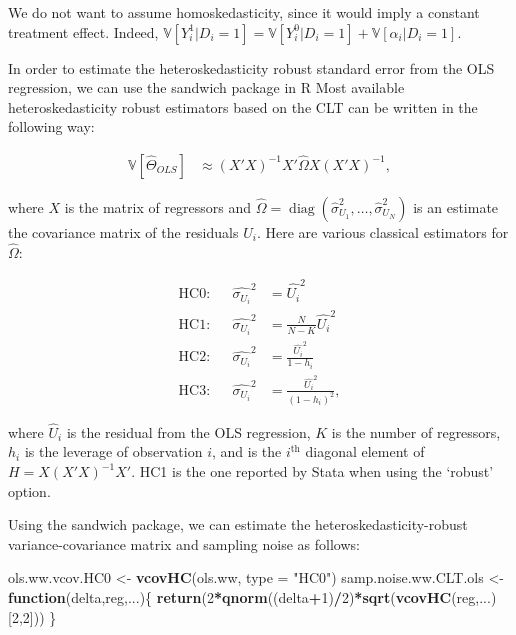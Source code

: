 \documentclass[]{book}
\newenvironment{Shaded}{\begin{snugshade}}{\end{snugshade}}
\newcommand{\KeywordTok}[1]{\textcolor[rgb]{0.13,0.29,0.53}{\textbf{#1}}}
\newcommand{\DataTypeTok}[1]{\textcolor[rgb]{0.13,0.29,0.53}{#1}}
\newcommand{\DecValTok}[1]{\textcolor[rgb]{0.00,0.00,0.81}{#1}}
\newcommand{\StringTok}[1]{\textcolor[rgb]{0.31,0.60,0.02}{#1}}
\newcommand{\ControlFlowTok}[1]{\textcolor[rgb]{0.13,0.29,0.53}{\textbf{#1}}}
\newcommand{\OperatorTok}[1]{\textcolor[rgb]{0.81,0.36,0.00}{\textbf{#1}}}
\newcommand{\NormalTok}[1]{#1}
\newcommand{\var}[1]{\mathbb{V}[ #1 ]}
\DeclareMathOperator{\diag}{diag}
\theoremstyle{definition}
\theoremstyle{definition}
\theoremstyle{definition}
\theoremstyle{remark}
\let\BeginKnitrBlock\begin \let\EndKnitrBlock\end
\begin{document}
We do not want to assume homoskedasticity, since it would imply a
constant treatment effect. Indeed,
\(\var{Y_i^1|D_i=1} = \var{Y_i^0|D_i=1}+\var{\alpha_i|D_i=1}\).

\BeginKnitrBlock{remark}
\iffalse{} {Remark. } \fi{}In order to estimate the heteroskedasticity
robust standard error from the OLS regression, we can use the sandwich
package in R Most available heteroskedasticity robust estimators based
on the CLT can be written in the following way:
\EndKnitrBlock{remark}

\begin{align*}
  \var{\hat{\Theta}_{OLS}} & \approx (X'X)^{-1}X'\hat{\Omega}X(X'X)^{-1},
\end{align*}

where \(X\) is the matrix of regressors and
\(\hat{\Omega}=\diag(\hat{\sigma}^2_{U_1},\dots,\hat{\sigma}^2_{U_N})\)
is an estimate the covariance matrix of the residuals \(U_i\). Here are
various classical estimators for \(\hat{\Omega}\):

\begin{align*}
  \text{HC0:} & & \hat{\sigma_{U_i}}^2 & = \hat{U_i}^2 \\
  \text{HC1:} & & \hat{\sigma_{U_i}}^2 & = \frac{N}{N-K}\hat{U_i}^2 \\
  \text{HC2:} & & \hat{\sigma_{U_i}}^2 & = \frac{\hat{U_i}^2}{1-h_i} \\
  \text{HC3:} & & \hat{\sigma_{U_i}}^2 & = \frac{\hat{U_i}^2}{(1-h_i)^2}, 
\end{align*}

where \(\hat{U}_i\) is the residual from the OLS regression, \(K\) is
the number of regressors, \(h_i\) is the leverage of observation \(i\),
and is the \(i^{\text{th}}\) diagonal element of \(H=X(X'X)^{-1}X'\).
HC1 is the one reported by Stata when using the `robust' option.

\BeginKnitrBlock{example}
\protect\hypertarget{exm:unnamed-chunk-54}{}{\label{exm:unnamed-chunk-54}
}Using the sandwich package, we can estimate the
heteroskedasticity-robust variance-covariance matrix and sampling noise
as follows:
\EndKnitrBlock{example}

\begin{Shaded}
\begin{Highlighting}[]
\NormalTok{ols.ww.vcov.HC0 <-}\StringTok{ }\KeywordTok{vcovHC}\NormalTok{(ols.ww, }\DataTypeTok{type =} \StringTok{"HC0"}\NormalTok{)}
\NormalTok{samp.noise.ww.CLT.ols <-}\StringTok{ }\ControlFlowTok{function}\NormalTok{(delta,reg,...)\{}
  \KeywordTok{return}\NormalTok{(}\DecValTok{2}\OperatorTok{*}\KeywordTok{qnorm}\NormalTok{((delta}\OperatorTok{+}\DecValTok{1}\NormalTok{)}\OperatorTok{/}\DecValTok{2}\NormalTok{)}\OperatorTok{*}\KeywordTok{sqrt}\NormalTok{(}\KeywordTok{vcovHC}\NormalTok{(reg,...)[}\DecValTok{2}\NormalTok{,}\DecValTok{2}\NormalTok{]))}
\NormalTok{\}}
\end{Highlighting}
\end{Shaded}
\end{document}
